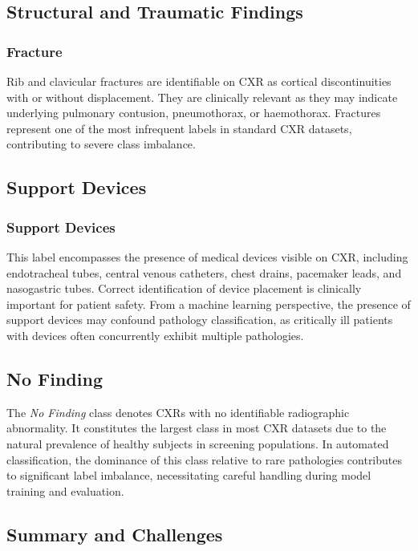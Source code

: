 \subsection{Structural and Traumatic Findings}

\subsubsection{Fracture}
Rib and clavicular fractures are identifiable on CXR as cortical discontinuities with or without 
displacement. They are clinically relevant as they may indicate underlying pulmonary contusion, 
pneumothorax, or haemothorax. Fractures represent one of the most infrequent labels in standard 
CXR datasets, contributing to severe class imbalance.

\subsection{Support Devices}

\subsubsection{Support Devices}
This label encompasses the presence of medical devices visible on CXR, including endotracheal tubes, 
central venous catheters, chest drains, pacemaker leads, and nasogastric tubes. Correct identification 
of device placement is clinically important for patient safety. From a machine learning perspective, 
the presence of support devices may confound pathology classification, as critically ill patients 
with devices often concurrently exhibit multiple pathologies.

\subsection{No Finding}

The \textit{No Finding} class denotes CXRs with no identifiable radiographic abnormality. It constitutes 
the largest class in most CXR datasets due to the natural prevalence of healthy subjects in screening 
populations. In automated classification, the dominance of this class relative to rare pathologies 
contributes to significant label imbalance, necessitating careful handling during model training 
and evaluation.

\subsection{Summary and Challenges}

